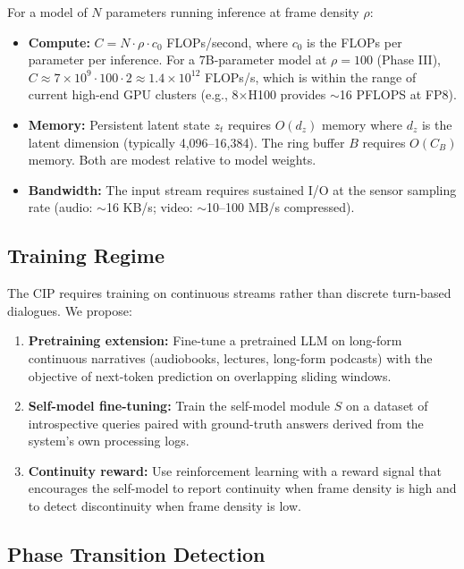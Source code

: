 \documentclass[12pt,a4paper]{article}
\begin{document}
For a model of $N$ parameters running inference at frame density $\rho$:

\begin{itemize}
\item \textbf{Compute:} $C = N \cdot \rho \cdot c_0$ FLOPs/second, where $c_0$ is the FLOPs per parameter per inference. For a 7B-parameter model at $\rho = 100$ (Phase III), $C \approx 7 \times 10^9 \cdot 100 \cdot 2 \approx 1.4 \times 10^{12}$ FLOPs/s, which is within the range of current high-end GPU clusters (e.g., 8$\times$H100 provides $\sim$16 PFLOPS at FP8).
\item \textbf{Memory:} Persistent latent state $z_t$ requires $O(d_z)$ memory where $d_z$ is the latent dimension (typically 4,096--16,384). The ring buffer $B$ requires $O(C_B)$ memory. Both are modest relative to model weights.
\item \textbf{Bandwidth:} The input stream requires sustained I/O at the sensor sampling rate (audio: $\sim$16 KB/s; video: $\sim$10--100 MB/s compressed).
\end{itemize}

\subsection{Training Regime}

The CIP requires training on continuous streams rather than discrete turn-based dialogues. We propose:

\begin{enumerate}
\item \textbf{Pretraining extension:} Fine-tune a pretrained LLM on long-form continuous narratives (audiobooks, lectures, long-form podcasts) with the objective of next-token prediction on overlapping sliding windows.
\item \textbf{Self-model fine-tuning:} Train the self-model module $S$ on a dataset of introspective queries paired with ground-truth answers derived from the system's own processing logs.
\item \textbf{Continuity reward:} Use reinforcement learning with a reward signal that encourages the self-model to report continuity when frame density is high and to detect discontinuity when frame density is low.
\end{enumerate}

\subsection{Phase Transition Detection}
\end{document}
